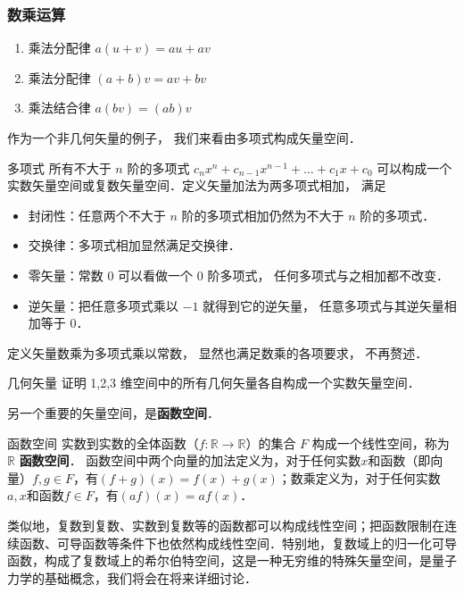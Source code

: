 \subsubsection{数乘运算}
\begin{enumerate}
\item 乘法分配律 $a(u + v) = au + av$ 
\item 乘法分配律 $(a + b)v = av + bv$
\item 乘法结合律 $a (b v) = (ab) v$
\end{enumerate}

作为一个非几何矢量的例子， 我们来看由多项式构成矢量空间．

\begin{example}{多项式}\label{LSpace_ex1}
所有不大于 $n$ 阶的多项式 $c_n x^n + c_{n-1} x^{n-1} + \dots + c_1 x + c_0$ 可以构成一个实数矢量空间或复数矢量空间．定义矢量加法为两多项式相加， 满足
\begin{itemize}
\item 封闭性：任意两个不大于 $n$ 阶的多项式相加仍然为不大于 $n$ 阶的多项式．
\item 交换律：多项式相加显然满足交换律．
\item 零矢量：常数 0 可以看做一个 0 阶多项式， 任何多项式与之相加都不改变．
\item 逆矢量：把任意多项式乘以 $-1$ 就得到它的逆矢量， 任意多项式与其逆矢量相加等于 0．
\end{itemize}
定义矢量数乘为多项式乘以常数， 显然也满足数乘的各项要求， 不再赘述．
\end{example}

\begin{exercise}{几何矢量}
证明 1,2,3 维空间中的所有几何矢量各自构成一个实数矢量空间．
\end{exercise}

另一个重要的矢量空间，是\textbf{函数空间}．

\begin{example}{函数空间}\label{LSpace_ex2}
实数到实数的全体函数（$f:\mathbb R \to \mathbb R$）的集合 $F$ 构成一个线性空间，称为 $\mathbb{R}$ \textbf{函数空间}． 函数空间中两个向量的加法定义为，对于任何实数$x$和函数（即向量）$f, g\in F$，有$(f+g)(x)=f(x)+g(x)$；数乘定义为，对于任何实数$a, x$和函数$f\in F$，有$(af)(x)=af(x)$．

类似地，复数到复数、实数到复数等的函数都可以构成线性空间；把函数限制在连续函数、可导函数等条件下也依然构成线性空间．特别地，复数域上的归一化可导函数，构成了复数域上的希尔伯特空间，这是一种无穷维的特殊矢量空间，是量子力学的基础概念，我们将会在将来详细讨论．
\end{example}

